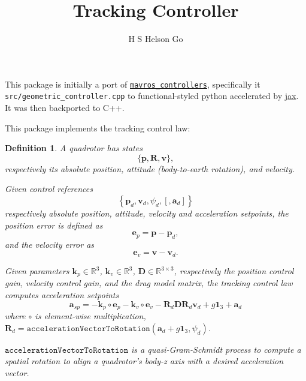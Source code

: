 \documentclass{article}
\title{Tracking Controller}
\author{H S Helson Go}
\theoremstyle{plain}
\newtheorem{defn}{Definition}
\begin{document}
\maketitle

This package is initially a port of \href{https://github.com/Jaeyoung-Lim/mavros_controllers}{\lstinline!mavros_controllers!}, specifically it \lstinline!src/geometric_controller.cpp! to functional-styled python accelerated by \href{https://github.com/google/jax}{jax}.
It was then backported to C++.

This package implements the tracking control law:
\begin{defn}
    A quadrotor has states
    \begin{equation}
        \{\mathbf{p},\mathbf{R},\mathbf{v}\},
    \end{equation}
    respectively its absolute position, attitude (body-to-earth rotation), and velocity.

    Given control references
    \begin{equation}
        \left\{\mathbf{p}_d,\mathbf{v}_d,\psi_d,\left[,\mathbf{a}_d\right]\right\}
    \end{equation}
    respectively \emph{absolute} position, attitude, velocity and acceleration setpoints, the position error is defined as
    \begin{equation}
        \mathbf{e}_p = \mathbf{p} - \mathbf{p}_d,
    \end{equation}
    and the velocity error as
    \begin{equation}
        \mathbf{e}_v = \mathbf{v} - \mathbf{v}_d.
    \end{equation}

    Given parameters \(\mathbf{k}_p\in\mathbb{R}^3\), \(\mathbf{k}_v\in\mathbb{R}^3\), \(\mathbf{D}\in\mathbb{R}^{3\times 3}\), respectively the position control gain, velocity control gain, and the drag model matrix, the tracking control law computes acceleration setpoints
    \begin{equation}
        \mathbf{a}_{sp} = -\mathbf{k}_p\circ\mathbf{e}_p - \mathbf{k}_v\circ\mathbf{e}_v - \mathbf{R}_d\mathbf{D}\mathbf{R}_d\mathbf{v}_d + g\mathbf{1}_3 + \mathbf{a}_d
    \end{equation}
    where \(\circ\) is element-wise multiplication, \(\mathbf{R}_d = \mathtt{accelerationVectorToRotation}(\mathbf{a}_d + g\mathbf{1}_3, \psi_d)\).

    \(\mathtt{accelerationVectorToRotation}\) is a quasi-Gram-Schmidt process to compute a spatial rotation to align a quadrotor's body-z axis with a desired acceleration vector.


\end{defn}
\end{document}
